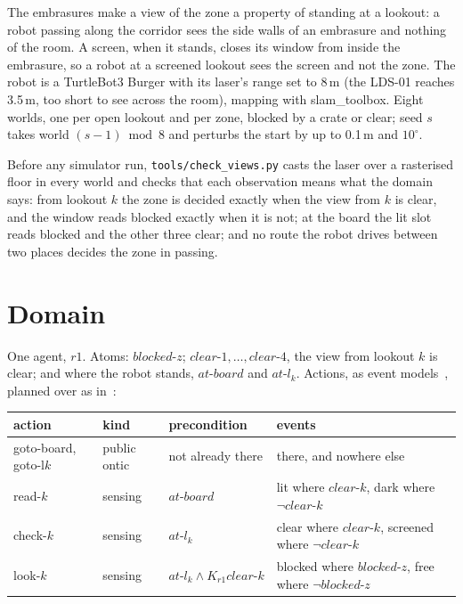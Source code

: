 \documentclass[11pt,a4paper]{article}
\theoremstyle{definition}
\newcommand{\code}[1]{\texttt{\small #1}}
\newcommand{\cl}[1]{\mathit{clear\text{-}#1}}
\newcommand{\bz}{\mathit{blocked\text{-}z}}
\newcommand{\at}[1]{\mathit{at\text{-}#1}}
\newcommand{\act}[1]{\textsf{#1}}
\begin{document}
\noindent
The embrasures make a view of the zone a property of standing at a lookout: a
robot passing along the corridor sees the side walls of an embrasure and
nothing of the room. A screen, when it stands, closes its window from inside
the embrasure, so a robot at a screened lookout sees the screen and not the
zone. The robot is a TurtleBot3 Burger with its laser's range set to 8\,m (the
LDS-01 reaches 3.5\,m, too short to see across the room), mapping with
slam\_toolbox. Eight worlds, one per open lookout and per zone, blocked by a
crate or clear; seed $s$ takes world $(s-1) \bmod 8$ and perturbs the start by
up to 0.1\,m and $10^\circ$.

Before any simulator run, \code{tools/check\_views.py} casts the laser over a
rasterised floor in every world and checks that each observation means what the
domain says: from lookout $k$ the zone is decided exactly when the view from
$k$ is clear, and the window reads blocked exactly when it is not; at the board
the lit slot reads blocked and the other three clear; and no route the robot
drives between two places decides the zone in passing.

\section{Domain}

One agent, $r1$. Atoms: $\bz$; $\cl{1}, \ldots, \cl{4}$, the view from lookout
$k$ is clear; and where the robot stands, $\at{board}$ and $\at{l_k}$. Actions,
as event models~\cite{bms1998}, planned over as in~\cite{ba2011}:

\begin{center}
\small
\begin{tabularx}{\textwidth}{@{}l l X X@{}}
\toprule
action & kind & precondition & events \\
\midrule
\act{goto-board}, \act{goto-l$k$} & public ontic & not already there & there, and nowhere else \\
\act{read-$k$} & sensing & $\at{board}$ & lit where $\cl{k}$, dark where $\neg\cl{k}$ \\
\act{check-$k$} & sensing & $\at{l_k}$ & clear where $\cl{k}$, screened where $\neg\cl{k}$ \\
\act{look-$k$} & sensing & $\at{l_k} \wedge K_{r1}\cl{k}$ & blocked where $\bz$, free where $\neg\bz$ \\
\bottomrule
\end{tabularx}
\end{center}
\end{document}
